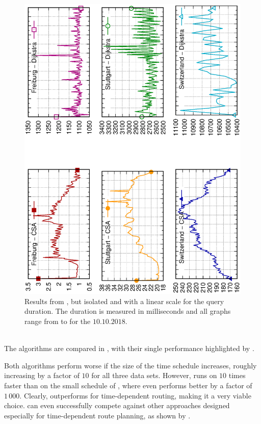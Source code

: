 	\begin{figure}[!ht]
		 \begin{center}
			\includegraphics[scale=0.55,angle=-90]{res/plots/uniModalTimeDependentResultsSingle}
		\end{center}
		\caption{Results from , but isolated and with a linear scale for the query duration.
			The duration is measured in milliseconds and all graphs range from  to  for the $10.10.2018$.}
		\label{uniModalTimeDependentResultsSingle}
	\end{figure}\quad\\
	 The algorithms are compared in , with their single performance
	 highlighted by .
	 
	 Both algorithms perform worse if the size of the time schedule increases, roughly increasing by a factor of $10$ for all three data sets.
	 However, \csa runs on \switzerlandR $10$ times faster than \dijkstra on the small schedule of \freiburgR, where \csa even performs better
	 by a factor of $1\,000$. Clearly, \csa outperforms \dijkstra for time-dependent routing, making it a very viable choice. \csa can even successfully
	 compete against other approaches designed especially for time-dependent route planning, as shown by .
	 
